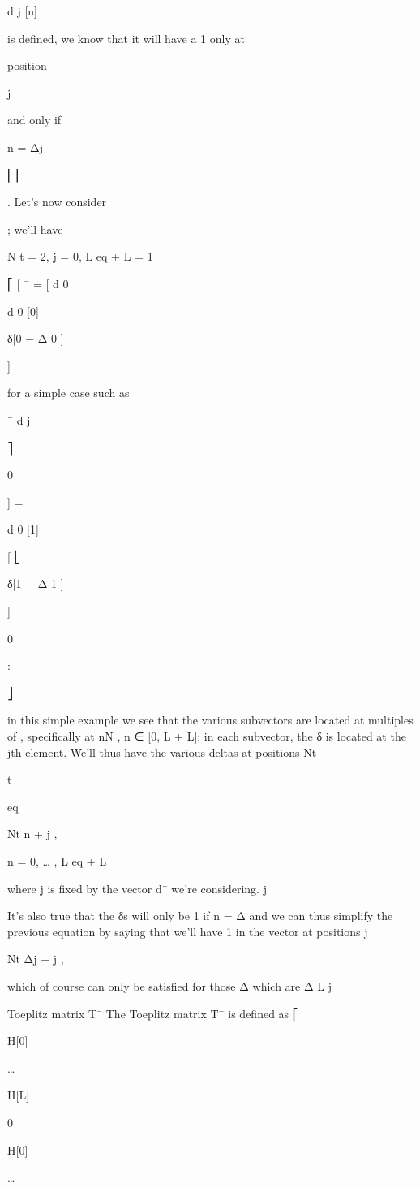 {d j [n]

is defined, we know that it will have a 1 only at

position

j

and only if

n = Δj

⎢⎥

. Let's now consider

; we'll have

N t = 2, j = 0, L eq + L = 1

⎡
[
¯ = [
d 0

d 0 [0]

δ[0 − Δ 0 ]

]

for a simple case such as

¯
d j

⎤

0

] =

d 0 [1]

[
⎣

δ[1 − Δ 1 ]

]

0

:

⎦

in this simple example we see that the various subvectors are located at multiples of
, specifically at nN , n ∈ [0, L + L]; in each subvector, the δ is located at the jth element. We'll thus have the various deltas at positions Nt

t

eq

Nt n + j ,

n = 0, … , L eq + L

where j is fixed by the vector d¯ we're considering.
j

It's also true that the δs will only be 1 if n = Δ and we can thus simplify the previous equation by saying that we'll have 1 in the vector at positions j

Nt Δj + j ,

which of course can only be satisfied for those Δ which are Δ \leq L j

Toeplitz matrix T¯
The Toeplitz matrix T¯ is defined as
⎡

H[0]

…

H[L]

0

H[0]

…

}
